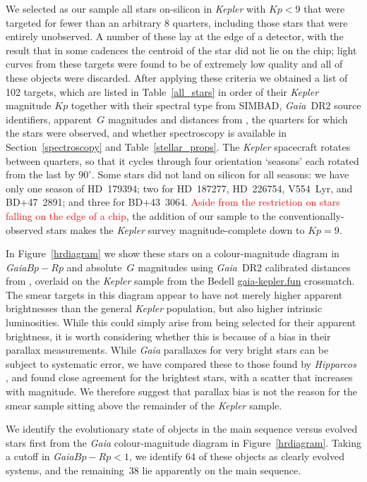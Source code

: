 \documentclass[a4paper,fleqn,usenatbib]{mnras}
\newcommand{\kepler}{\emph{Kepler}\xspace}
\newcommand{\gaia}{\emph{Gaia}\xspace}
\begin{document}
We selected as our sample all stars on-silicon in \kepler with $Kp<9$ that were targeted for fewer than an arbitrary $8$ quarters, including those stars that were entirely unobserved. A number of these lay at the edge of a detector, with the result that in some cadences the centroid of the star did not lie on the chip; light curves from these targets were found to be of extremely low quality and all of these objects were discarded. After applying these criteria we obtained a list of 102 targets, which are listed in Table~\ref{all_stars} in order of their \kepler magnitude $Kp$ together with their spectral type from SIMBAD, \gaia~DR2 source identifiers, apparent~$G$ magnitudes and distances from \citet{gaiadists}, the quarters for which the stars were observed, and whether spectroscopy is available in Section~\ref{spectroscopy} and Table~\ref{stellar_props}. The \kepler spacecraft rotates between quarters, so that it cycles through four orientation `seasons' each rotated from the last by $90^{\circ}$. Some stars did not land on silicon for all seasons: we have only one season of HD~179394; two for HD~187277, HD~226754, V554~Lyr, and BD+47~2891; and three for BD+43~3064. \textcolor{red}{Aside from the restriction on stars falling on the edge of a chip}, the addition of our sample to the conventionally-observed stars makes the \kepler survey magnitude-complete down to $Kp=9$. 

In Figure~\ref{hrdiagram} we show these stars on a colour-magnitude diagram in \gaia $Bp-Rp$ and absolute~$G$ magnitudes using \gaia~DR2 calibrated distances from \citet{gaiadists}, overlaid on the \kepler sample from the Bedell \url{gaia-kepler.fun} crossmatch. The smear targets in this diagram appear to have not merely higher apparent brightnesses than the general \kepler population, but also higher intrinsic luminosities. While this could simply arise from being selected for their apparent brightness, it is worth considering whether this is because of a bias in their parallax measurements. While \gaia parallaxes for very bright stars can be subject to systematic error, we have compared these to those found by \emph{Hipparcos} \citep{vanleeuwen07b}, and found close agreement for the brightest stars, with a scatter that increases with magnitude. We therefore suggest that parallax bias is not the reason for the smear sample sitting above the remainder of the \kepler sample.

We identify the evolutionary state of objects in the main sequence versus evolved stars first from the \gaia colour-magnitude diagram in Figure~\ref{hrdiagram}. Taking a cutoff in \gaia $Bp-Rp < 1$, we identify 64 of these objects as clearly evolved systems, and the remaining~38 lie apparently on the main sequence. 
\end{document}
